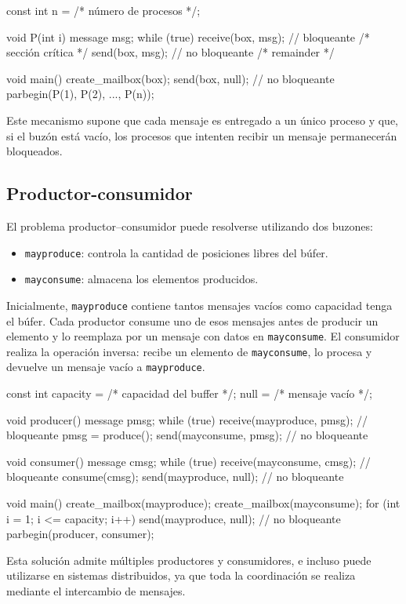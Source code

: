 \begin{ccode}[title=Programa de exclusión mutua usando paso de mensajes]
const int n = /* número de procesos */;

void P(int i) {
  message msg;
  while (true) {
    receive(box, msg); // bloqueante
    /* sección crítica */
    send(box, msg); // no bloqueante
    /* remainder */
  }
}

void main() {
  create_mailbox(box);
  send(box, null); // no bloqueante
  parbegin(P(1), P(2), ..., P(n));
}
\end{ccode}

Este mecanismo supone que cada mensaje es entregado a un único proceso y que, si el buzón está vacío, los procesos que intenten recibir un mensaje permanecerán bloqueados.

\subsection{Productor-consumidor}

El problema productor--consumidor puede resolverse utilizando dos buzones:
\begin{itemize}
  \item \texttt{mayproduce}: controla la cantidad de posiciones libres del búfer.
  \item \texttt{mayconsume}: almacena los elementos producidos.
\end{itemize}

Inicialmente, \texttt{mayproduce} contiene tantos mensajes vacíos como capacidad tenga el búfer. Cada productor consume uno de esos mensajes antes de producir un elemento y lo reemplaza por un mensaje con datos en \texttt{mayconsume}. El consumidor realiza la operación inversa: recibe un elemento de \texttt{mayconsume}, lo procesa y devuelve un mensaje vacío a \texttt{mayproduce}.

\begin{ccode}[title=Problema productor-consumidor con paso de mensajes]
const int capacity = /* capacidad del buffer */;
null = /* mensaje vacío */;

void producer() {
  message pmsg;
  while (true) {
    receive(mayproduce, pmsg); // bloqueante
    pmsg = produce();
    send(mayconsume, pmsg); // no bloqueante
  }
}

void consumer() {
  message cmsg;
  while (true) {
    receive(mayconsume, cmsg); // bloqueante
    consume(cmsg);
    send(mayproduce, null); // no bloqueante
  }
}

void main() {
  create_mailbox(mayproduce);
  create_mailbox(mayconsume);
  for (int i = 1; i <= capacity; i++)
    send(mayproduce, null); // no bloqueante
  parbegin(producer, consumer);
}
\end{ccode}

Esta solución admite múltiples productores y consumidores, e incluso puede utilizarse en sistemas distribuidos, ya que toda la coordinación se realiza mediante el intercambio de mensajes.
